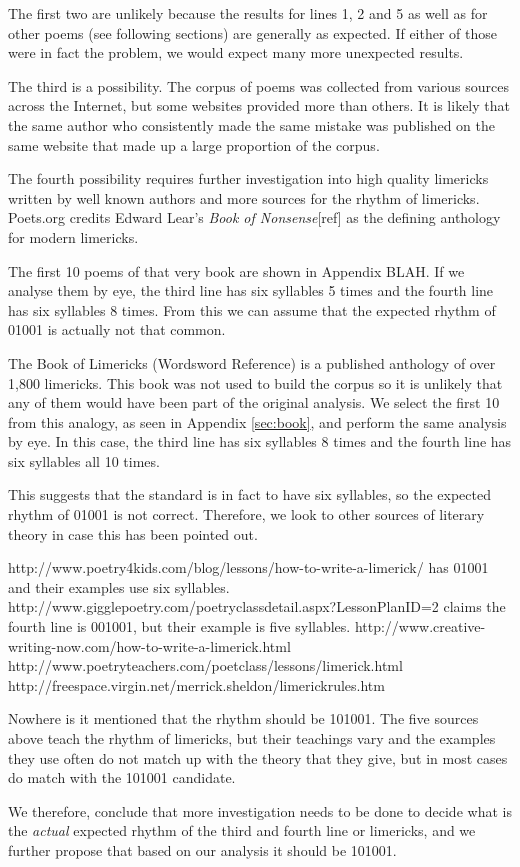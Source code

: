 \begin{description}
The first two are unlikely because the results for lines 1, 2 and 5 as well as for other poems (see following sections) are generally as expected. If either of those were in fact the problem, we would expect many more unexpected results.

The third is a possibility. The corpus of poems was collected from various sources across the Internet, but some websites provided more than others. It is likely that the same author who consistently made the same mistake was published on the same website that made up a large proportion of the corpus.

The fourth possibility requires further investigation into high quality limericks written by well known authors and more sources for the rhythm of limericks. Poets.org credits Edward Lear's \textit{Book of Nonsense}[ref] as the defining anthology for modern limericks.

The first 10 poems of that very book are shown in Appendix BLAH. If we analyse them by eye, the third line has six syllables 5 times and the fourth line has six syllables 8 times. From this we can assume that the expected rhythm of 01001 is actually not that common.

The Book of Limericks (Wordsword Reference) is a published anthology of over 1,800 limericks. This book was not used to build the corpus so it is unlikely that any of them would have been part of the original analysis. We select the first 10 from this analogy, as seen in Appendix \ref{sec:book}, and perform the same analysis by eye. In this case, the third line has six syllables 8 times and the fourth line has six syllables all 10 times.

This suggests that the standard is in fact to have six syllables, so the expected rhythm of 01001 is not correct. Therefore, we look to other sources of literary theory in case this has been pointed out.

http://www.poetry4kids.com/blog/lessons/how-to-write-a-limerick/ has 01001 and their examples use six syllables.
http://www.gigglepoetry.com/poetryclassdetail.aspx?LessonPlanID=2 claims the fourth line is 001001, but their example is five syllables.
http://www.creative-writing-now.com/how-to-write-a-limerick.html
http://www.poetryteachers.com/poetclass/lessons/limerick.html
http://freespace.virgin.net/merrick.sheldon/limerickrules.htm

Nowhere is it mentioned that the rhythm should be 101001. The five sources above teach the rhythm of limericks, but their teachings vary and the examples they use often do not match up with the theory that they give, but in most cases do match with the 101001 candidate.

We therefore, conclude that more investigation needs to be done to decide what is the \textit{actual} expected rhythm of the third and fourth line or limericks, and we further propose that based on our analysis it should be 101001.
\end{description}


